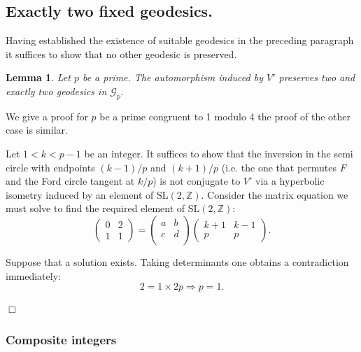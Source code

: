 \documentclass[12pt,a4paper]{amsart}
\newtheorem{lem}[thm]{Lemma}
\def\ZZ{\mathbb{Z}}
\def\sl2{\mathrm{SL}(2, \ZZ)}
\def\ggp{\mathcal{G}_p}
\begin{document}
\subsection{Exactly two fixed geodesics.}

Having established the existence of suitable geodesics in the preceding paragraph
it suffices to show that no other geodesic is preserved.


\begin{lem} \label{the end}
Let $p$ be a prime.
The automorphism induced by $V'$ preserves two and exactly two geodesics in $\ggp$.
\end{lem}


\proof 
We give a proof for  $p$ be a prime congruent to 1 modulo 4
the proof of the other case is similar.

Let $1< k < p-1$  be an integer. 
It suffices to show that the inversion in the semi circle with endpoints  
 $(k-1)/p$ and  $(k+1)/p$
(i.e. the one that permutes $F$ and the Ford circle tangent at $k/p$)
is not conjugate to $V'$ 
via a hyperbolic isometry induced by an element of $\sl2$.
Consider the  matrix equation we must solve 
to find the required element of $\sl2$:
\begin{equation}
\begin{pmatrix}
0& 2\\
1 & 1
\end{pmatrix}
= 
\begin{pmatrix}
a & b \\
c & d\\
\end{pmatrix}
\begin{pmatrix}
k + 1 & k-1 \\
p  & p
\end{pmatrix}.
\end{equation}

Suppose that a solution exists. Taking determinants one obtains a contradiction immediately:
$$ 2 = 1 \times 2p \Rightarrow p = 1.$$

\hfill $\Box$


\subsubsection{Composite integers}
\end{document}
